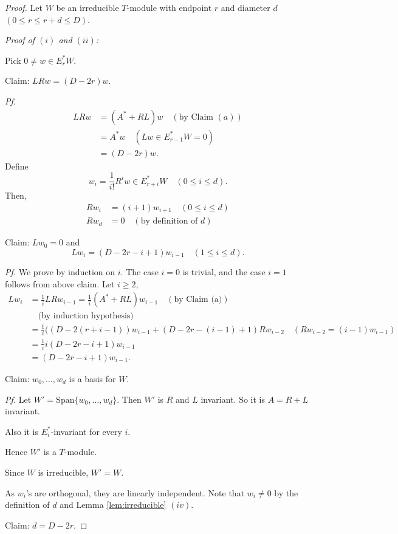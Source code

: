 \documentclass[
]{book}
\theoremstyle{definition}
\theoremstyle{definition}
\theoremstyle{definition}
\theoremstyle{definition}
\theoremstyle{remark}
\begin{document}
\begin{proof}
Let \(W\) be an irreducible \(T\)-module with endpoint \(r\) and diameter \(d\) \((0\leq r \leq r+d \leq D)\).

\emph{Proof of \((i)\) and \((ii)\):}

Pick \(0\neq w \in E^*_rW\).

Claim: \(LRw = (D-2r)w\).

\emph{Pf.}
\begin{align} 
LRw & = (A^*+RL)w \quad (\text{by Claim }(a))\\
& = A^*w \quad (Lw \in E^*_{r-1}W = 0)\\
& = (D-2r)w.
\end{align}
Define
\[w_i = \frac{1}{i!}R^iw \in E^*_{r+i}W \quad (0\leq i \leq d).\]
Then,
\begin{align}
Rw_i & = (i+1)w_{i+1}\quad (0\leq i \leq d)\\
Rw_d & = 0 \quad (\text{by definition of }d)
\end{align}

Claim: \(Lw_0 = 0\) and
\[Lw_i = (D-2r-i+1)w_{i-1} \quad (1\leq i\leq d).\]

\emph{Pf.} We prove by induction on \(i\).
The case \(i=0\) is trivial, and the case \(i=1\) follows from above claim.
Let \(i\geq 2\),
\begin{align}
Lw_i & = \frac{1}{i}LRw_{i-1} = \frac{1}{i}(A^*+RL)w_{i-1} \quad (\text{by Claim (a)})\\
& \quad \text{(by induction hypothesis)}\\
& = \frac{1}{i}((D-2(r+i-1))w_{i-1} + (D-2r-(i-1)+1)Rw_{i-2} \quad (Rw_{i-2} = (i-1)w_{i-1})\\
& = \frac{1}{i}i(D-2r-i+1)w_{i-1}\\
& = (D-2r-i+1)w_{i-1}.
\end{align}

Claim: \(w_0, \ldots, w_d\) is a basis for \(W\).

\emph{Pf.}
Let \(W' = \mathrm{Span}\{w_0, \ldots, w_d\}\). Then \(W'\) is \(R\) and \(L\) invariant. So it is \(A = R+L\) invariant.

Also it is \(E^*_i\)-invariant for every \(i\).

Hence \(W'\) is a \(T\)-module.

Since \(W\) is irreducible, \(W' = W\).

As \(w_i\)'s are orthogonal, they are linearly independent. Note that \(w_i\neq 0\) by the definition of \(d\) and Lemma \ref{lem:irreducible} \((iv)\).

Claim: \(d = D-2r\).


\end{proof}
\end{document}
